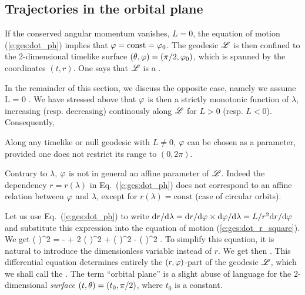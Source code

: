 \subsection{Trajectories in the orbital plane} \label{s:ges:trajectories}

If the conserved angular momentum vanishes, $L=0$, the equation of motion
(\ref{e:ges:dot_ph}) implies that $\varphi = \mathrm{const} = \varphi_0$. The geodesic
$\mathscr{L}$ is then confined to the 2-dimensional timelike surface
$(\theta, \varphi) = (\pi/2,\varphi_0)$, which is spanned by the coordinates $(t, r)$.
One says that $\mathscr{L}$ is a .

In the remainder of this section, we discuss the opposite case, namely we
assume
\be
    L \not = 0 .
\ee
We have stressed above that $\varphi$ is then a strictly monotonic function of $\lambda$,
increasing (resp. decreasing) continously along $\mathscr{L}$ for $L>0$ (resp. $L<0$).
Consequently,
\begin{greybox}
Along any timelike or null geodesic with $L\not =0$,
$\varphi$ can be chosen as a parameter, provided one does not restrict its
range to $(0,2\pi)$.
\end{greybox}
Contrary to $\lambda$, $\varphi$ is not in general an affine parameter of $\mathscr{L}$.
Indeed the dependency $r = r(\lambda)$ in Eq.~(\ref{e:ges:dot_ph})
does not correspond to an affine relation between $\varphi$ and $\lambda$, except for
$r(\lambda) = \mathrm{const}$ (case of circular orbits).

Let us use Eq.~(\ref{e:ges:dot_ph}) to write
$\mathrm{d} r/ \mathrm{d}\lambda = \mathrm{d} r/\mathrm{d}\varphi \times \mathrm{d}\varphi/\mathrm{d}\lambda = L/r^2 \mathrm{d} r /\mathrm{d}\varphi$
and substitute this expression into the equation of motion
(\ref{e:ges:dot_r_square}). We get
\be
     \left(  \right)^2 =
      -  + 2  \left(  \right)^2 
     + \left(  \right)^2 - \left(  \right)^2 .
\ee
To simplify this equation, it is natural to introduce the dimensionless variable
\be
\ee
instead of $r$. We get then
\be \label{e:ges:DuDph_trajectories}
    .
\ee
This differential equation determines entirely the $(r,\varphi)$-part of the geodesic $\mathscr{L}$,
which we shall call the
.
The term ``orbital plane'' is a slight abuse of language for
the 2-dimensional \emph{surface} $(t,\theta) = (t_0, \pi/2)$, where $t_0$ is a constant.

